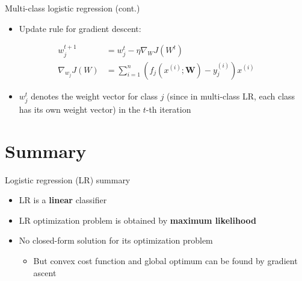 \documentclass[serif, aspectratio=169]{beamer}
\begin{document}
\begin{frame}{Multi-class logistic regression (cont.)}
    \begin{itemize}
        \item Update rule for gradient descent:
        
    \end{itemize}
    \begin{align*}
            w_j^{t+1} &= w_j^t - \eta \nabla _W J(W^t) \\
            \nabla _{w_{j}} J(W) &= \sum_{i=1}^{n} (f_j(x^{(i)}; \mathbf{W}) - y_j^{(i)})x^{(i)}
        \end{align*}
        
    \begin{itemize}
        \item $w_j^t$ denotes the weight vector for class $j$ (since in multi-class LR, each class has its own weight vector) in the $t$-th iteration
    \end{itemize}
\end{frame}


\section{Summary}

\begin{frame}{Logistic regression (LR) summary}
    \begin{itemize}
        \item LR is a \textbf{linear} classifier
        \item LR optimization problem is obtained by \textbf{maximum likelihood}
        \item No closed-form solution for its optimization problem
            \begin{itemize}
                \item But convex cost function and global optimum can be found by gradient ascent
            \end{itemize}
    \end{itemize}
\end{frame}


\end{document}
